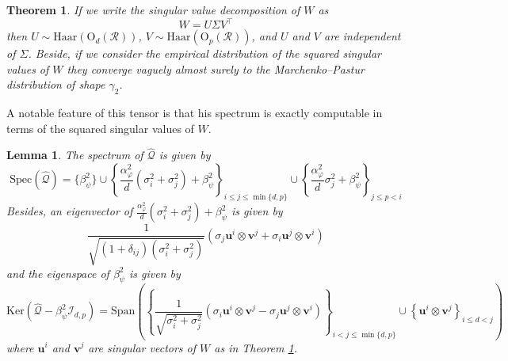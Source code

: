 \documentclass[letterpaper, 10pt, dvipsnames]{article}
\numberwithin{equation}{section}
\newcommand{\Q}{\mathcal{Q}}
\newcommand{\R}{\mathcal{R}}
\renewcommand{\u}{\mathbf{u}}
\renewcommand{\v}{\mathbf{v}}
\renewcommand{\phi}{\varphi}
\renewcommand{\hat}{\widehat}
\newtheorem{thm}[ccounter]{Theorem}
\newtheorem{lem}[ccounter]{Lemma}
\theoremstyle{definition}
\begin{document}
\begin{thm}\label{thm:svd}
  If we write the singular value decomposition of $W$ as 
  \[
  W = U\Sigma V^\top  
  \]
  then $U\sim\mathrm{Haar}(\mathrm{O}_d(\R))$, $V\sim \mathrm{Haar}(\mathrm{O}_p(\R))$, and $U$ and $V$ are independent of $\Sigma$. Beside, if we consider the empirical distribution of the squared singular values of $W$ they converge vaguely almost surely to the Marchenko--Pastur distribution of shape $\gamma_2$.  
\end{thm} 
A notable feature of this tensor is that his spectrum is exactly computable in terms of the squared singular values of $W$. 
\begin{lem}\label{lem:spectrumQhat}
  The spectrum of $\hat{\Q}$ is given by
  \[
  \mathrm{Spec}(\hat{\Q})
  =
  \{\beta_\psi^2\}\cup \left\{
    \frac{\alpha_\phi^2}{d}\left(
      \sigma_i^2+\sigma_j^2
    \right)
    +
    \beta_\psi^2
  \right\}_{i \leqslant j \leqslant \min\{d,p\}}
  \cup
  \left\{
    \frac{\alpha_\phi^2}{d}
    \sigma_j^2
    +\beta_\psi^2
  \right\}
  _{j \leqslant p < i }%
  \]
  Besides, an eigenvector of $\frac{\alpha_\phi^2}{d}(\sigma_i^2+\sigma_j^2)+\beta_\psi^2$ is given by
  \[
    \frac{1}{\sqrt{(1+\delta_{ij})(\sigma_i^2+\sigma_j^2)}}\left(\sigma_j\u^i\otimes \v^j + \sigma_i\u^j\otimes \v^i  \right)
  \]
  and the eigenspace of $\beta_\psi^2$ is given by
  \[
  \mathrm{Ker} \left(
    \hat{\Q}-\beta_\psi^2 \mathcal{I}_{d,p}
  \right)
  =
  \mathrm{Span} \left(
    \left\{
    \frac{1}{\sqrt{\sigma_i^2+\sigma_j^2}}\left(
      \sigma_i\u^i\otimes \v^j - \sigma_j\u^j\otimes \v^i
    \right)
    \right\}_{i < j\leqslant \min\{d,p\}}
    \cup
    \left\{
      \u^i\otimes \v^j
    \right\}_{ i \leqslant d < j}
  \right)
  \]  
  where $\u^i$ and $\v^j$ are singular vectors of $W$ as in Theorem \ref{thm:svd}.
\end{lem}
\end{document}
